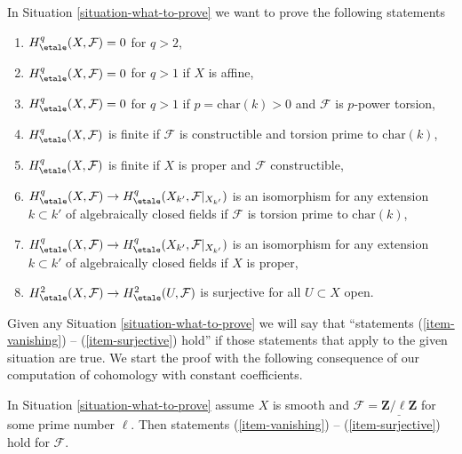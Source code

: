 \noindent
In Situation \ref{situation-what-to-prove}
we want to prove the following statements
\begin{enumerate}
\item
\label{item-vanishing}
$H^q_\etale(X, \mathcal{F}) = 0$ for $q > 2$,
\item
\label{item-vanishing-affine}
$H^q_\etale(X, \mathcal{F}) = 0$ for $q > 1$ if $X$ is affine,
\item
\label{item-vanishing-p-p}
$H^q_\etale(X, \mathcal{F}) = 0$ for $q > 1$ if $p = \text{char}(k) > 0$
and $\mathcal{F}$ is $p$-power torsion,
\item
\label{item-finite-prime-to-p}
$H^q_\etale(X, \mathcal{F})$ is finite if $\mathcal{F}$ is
constructible and torsion prime to $\text{char}(k)$,
\item
\label{item-finite-proper}
$H^q_\etale(X, \mathcal{F})$ is finite if $X$ is proper and
$\mathcal{F}$ constructible,
\item
\label{item-base-change-prime-to-p}
$H^q_\etale(X, \mathcal{F}) \to
H^q_\etale(X_{k'}, \mathcal{F}|_{X_{k'}})$ is an isomorphism
for any extension $k \subset k'$ of algebraically closed fields
if $\mathcal{F}$ is torsion prime to $\text{char}(k)$,
\item
\label{item-base-change-proper}
$H^q_\etale(X, \mathcal{F}) \to
H^q_\etale(X_{k'}, \mathcal{F}|_{X_{k'}})$ is an isomorphism
for any extension $k \subset k'$ of algebraically closed fields
if $X$ is proper,
\item
\label{item-surjective}
$H^2_\etale(X, \mathcal{F}) \to H^2_\etale(U, \mathcal{F})$
is surjective for all $U \subset X$ open.
\end{enumerate}
Given any Situation \ref{situation-what-to-prove}
we will say that
``statements (\ref{item-vanishing}) -- (\ref{item-surjective}) hold''
if those statements that apply to the given situation are true.
We start the proof with the following consequence of our computation
of cohomology with constant coefficients.

\begin{lemma}
\label{lemma-constant-smooth-statements}
In Situation \ref{situation-what-to-prove}
assume $X$ is smooth and $\mathcal{F} = \underline{\mathbf{Z}/\ell\mathbf{Z}}$
for some prime number $\ell$. Then statements
(\ref{item-vanishing}) -- (\ref{item-surjective}) hold
for $\mathcal{F}$.
\end{lemma}

